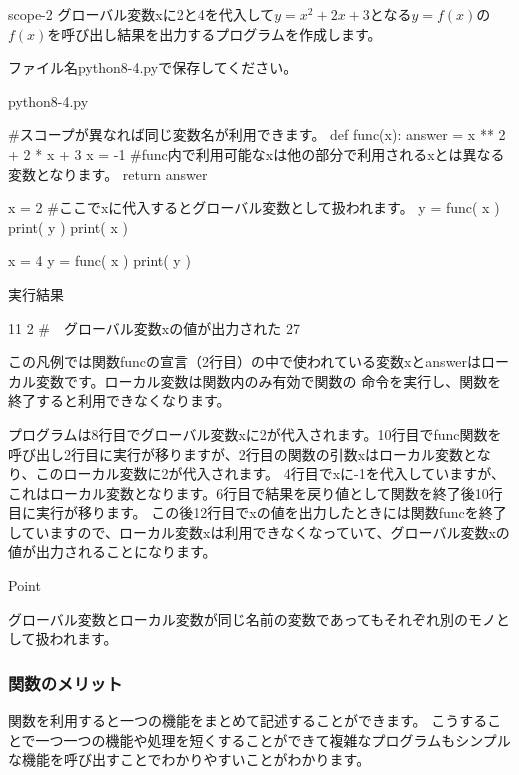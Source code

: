 \documentclass[11pt,a4paper,dvipdfmx,titlepage]{jsreport}
\begin{document}
\begin{pabox}{scope-2}
グローバル変数xに2と4を代入して$y = x^2 + 2 x + 3$となる$y = f(x)$の$f(x)$を呼び出し結果を出力するプログラムを作成します。

ファイル名python8-4.pyで保存してください。
\begin{codebox}{python8-4.py}
\begin{listing}{1}
#スコープが異なれば同じ変数名が利用できます。
def func(x):
    answer = x ** 2 + 2 * x + 3
    x = -1
    #func内で利用可能なxは他の部分で利用されるxとは異なる変数となります。
    return answer

x = 2
#ここでxに代入するとグローバル変数として扱われます。
y = func( x )
print( y )
print( x ) 

x = 4
y = func( x )
print( y )
\end{listing}
実行結果
\begin{listing}{1}
11
2   #　グローバル変数xの値が出力された
27
\end{listing}
\end{codebox}
この凡例では関数funcの宣言（2行目）の中で使われている変数xとanswerはローカル変数です。ローカル変数は関数内のみ有効で関数の
命令を実行し、関数を終了すると利用できなくなります。

プログラムは8行目でグローバル変数xに2が代入されます。10行目でfunc関数を呼び出し2行目に実行が移りますが、2行目の関数の引数xはローカル変数となり、このローカル変数に2が代入されます。
4行目でxに-1を代入していますが、これはローカル変数となります。6行目で結果を戻り値として関数を終了後10行目に実行が移ります。
この後12行目でxの値を出力したときには関数funcを終了していますので、ローカル変数xは利用できなくなっていて、グローバル変数xの値が出力されることになります。

\end{pabox}
\begin{hipoint}{Point}

グローバル変数とローカル変数が同じ名前の変数であってもそれぞれ別のモノとして扱われます。

\end{hipoint}
\newpage
\subsubsection{関数のメリット}
関数を利用すると一つの機能をまとめて記述することができます。
こうすることで一つ一つの機能や処理を短くすることができて複雑なプログラムもシンプルな機能を呼び出すことでわかりやすいことがわかります。
\end{document}

